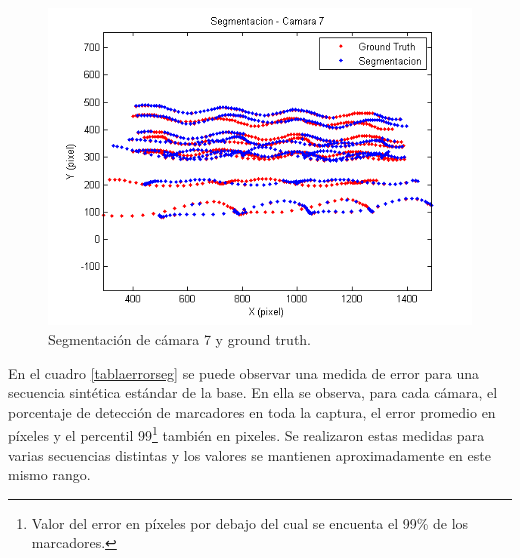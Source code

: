 \begin{figure}[H]
\begin{center}
\includegraphics[scale=0.6]{img/imagen_segmentacion_cam7_8_07_100_200.png}
\end{center}
\caption{Segmentación de cámara 7 y ground truth.}
\label{ejMedErr}
\end{figure}

En el cuadro \ref{tablaerrorseg} se puede observar una medida de error para una secuencia sintética estándar de la base. En ella se observa, para cada cámara, el porcentaje de detección de marcadores en toda la captura, el error promedio en píxeles y el percentil 99\footnote{Valor del error en píxeles por debajo del cual se encuenta el 99\% de los marcadores.} también en pixeles. Se realizaron estas medidas para varias secuencias distintas y los valores se mantienen aproximadamente en este mismo rango.

